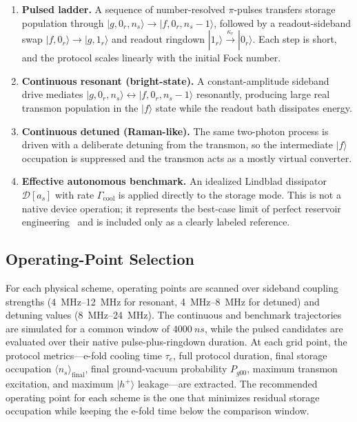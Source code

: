 \documentclass[aps,pra,twocolumn,reprint,floatfix,amsmath,amssymb]{revtex4-2}
\begin{document}
\begin{enumerate}
\item \textbf{Pulsed ladder.}  A sequence of number-resolved $\pi$-pulses transfers storage population through $|g,0_r,n_s\rangle \to |f,0_r,n_s{-}1\rangle$, followed by a readout-sideband swap $|f,0_r\rangle \to |g,1_r\rangle$ and readout ringdown $|1_r\rangle \xrightarrow{\kappa_r} |0_r\rangle$.
Each step is short, and the protocol scales linearly with the initial Fock number.

\item \textbf{Continuous resonant (bright-state).}  A constant-amplitude sideband drive mediates $|g,0_r,n_s\rangle \leftrightarrow |f,0_r,n_s{-}1\rangle$ resonantly, producing large real transmon population in the $|f\rangle$ state while the readout bath dissipates energy.

\item \textbf{Continuous detuned (Raman-like).}  The same two-photon process is driven with a deliberate detuning from the transmon, so the intermediate $|f\rangle$ occupation is suppressed and the transmon acts as a mostly virtual converter.

\item \textbf{Effective autonomous benchmark.}  An idealized Lindblad dissipator $\mathcal{D}[a_s]$ with rate $\Gamma_{\mathrm{cool}}$ is applied directly to the storage mode.
This is not a native device operation; it represents the best-case limit of perfect reservoir engineering~\cite{poyatos1996quantum} and is included only as a clearly labeled reference.
\end{enumerate}

\subsection{Operating-Point Selection}
\label{sec:opselect}

For each physical scheme, operating points are scanned over sideband coupling strengths (\SIrange{4}{12}{\MHz} for resonant, \SIrange{4}{8}{\MHz} for detuned) and detuning values (\SIrange{8}{24}{\MHz}).
The continuous and benchmark trajectories are simulated for a common window of $\SI{4000}{ns}$, while the pulsed candidates are evaluated over their native pulse-plus-ringdown duration.
At each grid point, the protocol metrics---e-fold cooling time $\tau_e$, full protocol duration, final storage occupation $\langle n_s \rangle_{\mathrm{final}}$, final ground-vacuum probability $P_{g00}$, maximum transmon excitation, and maximum $|h^+\rangle$ leakage---are extracted.
The recommended operating point for each scheme is the one that minimizes residual storage occupation while keeping the e-fold time below the comparison window.
\end{document}
